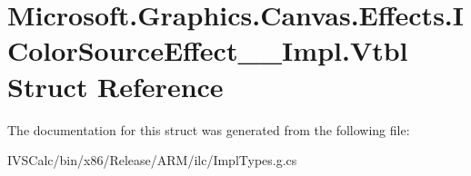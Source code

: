 \hypertarget{struct_microsoft_1_1_graphics_1_1_canvas_1_1_effects_1_1_i_color_source_effect_____impl_1_1_vtbl}{}\section{Microsoft.\+Graphics.\+Canvas.\+Effects.\+I\+Color\+Source\+Effect\+\_\+\+\_\+\+Impl.\+Vtbl Struct Reference}
\label{struct_microsoft_1_1_graphics_1_1_canvas_1_1_effects_1_1_i_color_source_effect_____impl_1_1_vtbl}


The documentation for this struct was generated from the following file\+:\begin{DoxyCompactItemize}
\item 
I\+V\+S\+Calc/bin/x86/\+Release/\+A\+R\+M/ilc/Impl\+Types.\+g.\+cs\end{DoxyCompactItemize}
